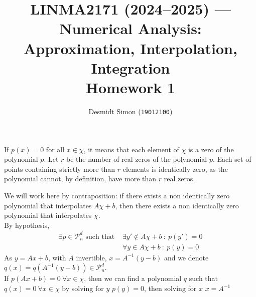 \documentclass[11pt]{article}
\title{LINMA2171 (2024–2025) — Numerical Analysis: Approximation, Interpolation, Integration\\
Homework 1}
\author{Desmidt Simon (\texttt{19012100})}
\begin{document}
\maketitle
\begin{tcolorbox}[breakable,
                  colback=white,
                  colframe=white!75!black,
                  title={A finite set \(\chi \subset \mathbb{R}^d\) is said to be \(\mathcal{P}_n^d\)-unisolvent if the only polynomial \(p \in P_n^d\) which vanishes on \(\chi\), i.e. \(p(x) = 0\) for all \(x \in\chi\), is identically zero. In the univariate case, which sets are \(P^1_n\)-unisolvent ?}
                 ]
    If \(p(x)=0\) for all \(x\in \chi\), it means that each element of \(\chi\) is a zero of the polynomial \(p\). Let \(r\) be the number of real zeros of the polynomial \(p\). Each set of points containing strictly more than \(r\) elements is identically zero, as the polynomial cannot, by definition, have more than \(r\) real zeros. 
\end{tcolorbox}
\begin{tcolorbox}[breakable,
                  colback=white,
                  colframe=white!75!black,
                  title={Show that \(P^d_n\)-unisolvent sets are invariant under affine invertible transformation, that is, if \(\chi\subset \mathbb{R}^d\) is \(P^d_n\)-unisolvent then \(A\chi + b = \{Ax + b | x \in \chi\}\) is also \(P^d_n\)-unisolvent, for any invertible matrix \(A \in \mathbb{R}^{d\times d}\) and \(b \in \mathbb{R}^d\).}
                 ]
    We will work here by contraposition: if there exists a non identically zero polynomial that interpolates \(A\chi+b\), then there exists a non identically zero polynomial that interpolates \(\chi\).\\

    By hypothesis,
    \begin{align}
        \exists p\in \mathcal{P}_n^d \text{ such that } & \exists y'\notin A\chi+b\: : \: p(y')=0\\
        & \forall y \in A\chi +b \: : \: p(y) = 0
    \end{align}
    As \(y=Ax+b\), with \(A\) invertible, \(x=A^{-1}(y-b)\) and we denote \(q(x) = q(A^{-1}(y-b))\in \mathcal{P}_n^d\).\\
    If \(p(Ax+b)=0 \:\forall x\in \chi\), then we can find a polynomial \(q\) such that \(q(x)=0 \:\forall x\in \chi\) by solving for \(y\) \(p(y)=0\), then solving for \(x\) \(x = A^{-1}\)
\end{tcolorbox}
\end{document}
